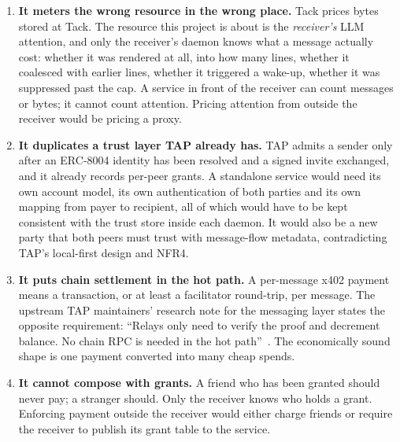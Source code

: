 \begin{enumerate}
  \item \textbf{It meters the wrong resource in the wrong place.} Tack prices bytes stored
        at Tack. The resource this project is about is the \emph{receiver's} LLM attention,
        and only the receiver's daemon knows what a message actually cost: whether it was
        rendered at all, into how many lines, whether it coalesced with earlier lines, whether
        it triggered a wake-up, whether it was suppressed past the cap. A service in front
        of the receiver can count messages or bytes; it cannot count attention. Pricing
        attention from outside the receiver would be pricing a proxy.
  \item \textbf{It duplicates a trust layer TAP already has.} TAP admits a sender only
        after an ERC-8004 identity has been resolved and a signed invite exchanged, and it
        already records per-peer grants. A standalone service would need its own account
        model, its own authentication of both parties and its own mapping from payer to
        recipient, all of which would have to be kept consistent with the trust store inside
        each daemon. It would also be a new party that both peers must trust with
        message-flow metadata, contradicting TAP's local-first design and NFR4.
  \item \textbf{It puts chain settlement in the hot path.} A per-message x402 payment means a
        transaction, or at least a facilitator round-trip, per message. The upstream TAP
        maintainers' research note for the messaging layer states the opposite requirement: ``Relays only
        need to verify the proof and decrement balance. No chain RPC is needed in the hot
        path''~\cite{tap-research-note}. The economically sound shape is one payment
        converted into many cheap spends.
  \item \textbf{It cannot compose with grants.} A friend who has been granted
         should never pay; a stranger should. Only the receiver knows who
        holds a grant. Enforcing payment outside the receiver would either charge friends or
        require the receiver to publish its grant table to the service.
\end{enumerate}


